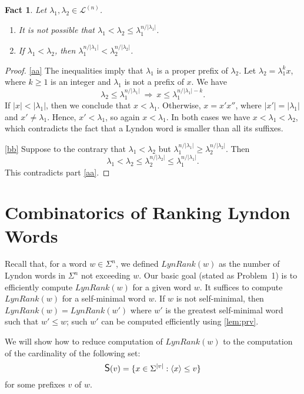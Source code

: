 \documentclass{article}
\newcommand{\mayqed}{}
\renewcommand{\L}{{\mathcal{L}}}
\newcommand{\CS}{\mbox{\large{\sf{S}}}}
\newcommand{\Lynd}{\mathit{LynRank}}
\newcommand{\minrot}[1]{\left\langle #1 \right\rangle}
\newtheorem{fact}[theorem]{Fact}
\theoremstyle{definition}
\theoremstyle{remark}
\begin{document}
\begin{fact}\label{fct:lyndon}
  Let $\lambda_1,\lambda_2 \in \L^{(n)}$.
  \begin{enumerate}[label={(\alph*)}]
    \item\label{aa}
      It is not possible that $\lambda_1 < \lambda_2 \le \lambda_1^{n/|\lambda_1|}$.
    \item\label{bb}
      If $\lambda_1 < \lambda_2$, then $\lambda_1^{n/|\lambda_1|} < \lambda_2^{n/|\lambda_2|}$.
  \end{enumerate}
\end{fact}
\begin{proof}
  \ref{aa} The inequalities imply that $\lambda_1$ is a proper prefix of $\lambda_2$.
  Let $\lambda_2 = \lambda_1^k x$, where $k \ge 1$ is an integer and $\lambda_1$ is not a prefix of $x$.
  We have
  $$\lambda_2 \le \lambda_1^{n/|\lambda_1|}\ \Longrightarrow\ x \le \lambda_1^{n/|\lambda_1|-k}.$$
  If $|x| < |\lambda_1|$, then we conclude that $x < \lambda_1$.
  Otherwise, $x=x'x''$, where $|x'| = |\lambda_1|$ and $x' \ne \lambda_1$.
  Hence, $x' < \lambda_1$, so again $x < \lambda_1$.
  In both cases we have $x < \lambda_1 < \lambda_2$, which contradicts
  the fact that a Lyndon word is smaller than all its suffixes.

  \ref{bb} Suppose to the contrary that $\lambda_1 < \lambda_2$ but $\lambda_1^{n/|\lambda_1|} \ge \lambda_2^{n/|\lambda_2|}$.
  Then
  $$\lambda_1 < \lambda_2 \le \lambda_2^{n/|\lambda_2|} \le \lambda_1^{n/|\lambda_1|}.$$
  This contradicts part \ref{aa}.
\mayqed\end{proof}





\section{Combinatorics of Ranking Lyndon Words}\label{sec:comb}
Recall that, for a word $w\in \Sigma^n$, we defined $\Lynd(w)$ as the number of Lyndon words
in $\Sigma^n$ not exceeding $w$.
Our basic goal (stated as Problem~1) is to efficiently compute $\Lynd(w)$ for a given word $w$.
It suffices to compute $\Lynd(w)$ for a self-minimal word $w$.
If $w$ is not self-minimal, then $\Lynd(w)=\Lynd(w')$ where $w'$ is the greatest self-minimal
word such that $w' \le w$; such $w'$ can be computed efficiently using \cref{lem:prv}.

We will show how to reduce computation of $\Lynd(w)$ to the computation 
of the cardinality of the following set:
$$\CS(v) = \{x \in \Sigma^{|v|} : \minrot{x}\le v\}$$
for some prefixes $v$ of $w$.
\end{document}
